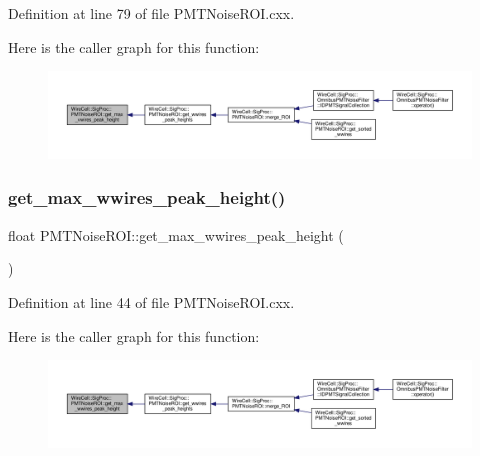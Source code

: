 Definition at line 79 of file P\+M\+T\+Noise\+R\+O\+I.\+cxx.

Here is the caller graph for this function\+:
\nopagebreak
\begin{figure}[H]
\begin{center}
\leavevmode
\includegraphics[width=350pt]{class_wire_cell_1_1_sig_proc_1_1_p_m_t_noise_r_o_i_a5c9e02b024551af28776257cfb336f45_icgraph}
\end{center}
\end{figure}
\mbox{\label{class_wire_cell_1_1_sig_proc_1_1_p_m_t_noise_r_o_i_a9239f0b7d6fa6d9bb1c12129e7d34352}} 
\subsubsection{\texorpdfstring{get\+\_\+max\+\_\+wwires\+\_\+peak\+\_\+height()}{get\_max\_wwires\_peak\_height()}}
{\footnotesize\ttfamily float P\+M\+T\+Noise\+R\+O\+I\+::get\+\_\+max\+\_\+wwires\+\_\+peak\+\_\+height (\begin{DoxyParamCaption}{ }\end{DoxyParamCaption})}



Definition at line 44 of file P\+M\+T\+Noise\+R\+O\+I.\+cxx.

Here is the caller graph for this function\+:
\nopagebreak
\begin{figure}[H]
\begin{center}
\leavevmode
\includegraphics[width=350pt]{class_wire_cell_1_1_sig_proc_1_1_p_m_t_noise_r_o_i_a9239f0b7d6fa6d9bb1c12129e7d34352_icgraph}
\end{center}
\end{figure}
\mbox{\label{class_wire_cell_1_1_sig_proc_1_1_p_m_t_noise_r_o_i_a55cdf5dad6e7476bbb73226876feb55f}} 
